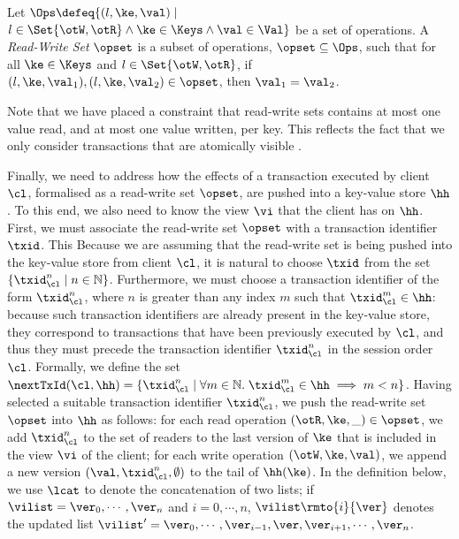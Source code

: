 \begin{definition}
Let 
$\Ops \defeq \{(l, \ke, \val) \mid$ $ l \in \Set{\otW, \otR} \land \ke \in \Keys \wedge \val \in \Val \}$ 
be a set of operations. 
A \emph{Read-Write Set} $\opset$ is a subset of operations, $\opset \subseteq \Ops$,
such that for all $\ke \in \Keys$ and \( l \in \Set{\otW, \otR} \),
if $(l, \ke, \val_1), (l, \ke, \val_2) \in \opset$, then $\val_1 = \val_2$.
\end{definition}
Note that we have placed a constraint that read-write sets contains at most one value read, 
and at most one value written, per key. This reflects the fact that we only consider transactions 
that are atomically visible \cite{laws}.

Finally, we need to address how the effects of a transaction executed by client $\cl$, formalised 
as a read-write set $\opset$, are pushed into a key-value store $\hh$. To this end, we also 
need to know the view $\vi$ that the client has on $\hh$.
First, we must associate the read-write set $\opset$ with a transaction identifier $\txid$. This 
Because we are assuming that the read-write set is being pushed into the key-value store from client $\cl$, 
it is natural to choose $\txid$ from the set $\{\txid_{\cl}^{n} \mid n \in \mathbb{N}\}$. 
Furthermore, we must choose a transaction identifier of the form 
$\txid_{\cl}^{n}$, where $n$ is greater than any index $m$ such that 
$\txid_{\cl}^{m} \in \hh$: because such transaction identifiers are already present 
in the key-value store, they correspond to transactions that have been previously executed 
by $\cl$, and thus they must precede the transaction identifier $\txid_{\cl}^{n}$ in the session 
order $\cl$. Formally, we define the set $\nextTxId(\cl, \hh) = \{ \txid_{\cl}^{n} \mid \forall m \in \mathbb{N}. \; 
\txid_{\cl}^{m} \in \hh \implies m < n\}$. 
Having selected a suitable transaction identifier $\txid_{\cl}^{n}$, we push the read-write set $\opset$ 
into $\hh$ as follows: for each read operation $(\otR, \ke, \_) \in \opset$, we add $\txid_{\cl}^{n}$ 
to the set of readers to the last version of $\ke$ that is included in the view $\vi$ of the client; 
for each write operation $(\otW, \ke, \val)$, we append a new version $(\val, \txid_{\cl}^{n}, \emptyset)$ 
to the tail of $\hh(\ke)$.
In the definition below, we use $\lcat$ to denote the concatenation of two lists; 
if $\vilist = \ver_0, \cdots, \ver_n$ and $i=0,\cdots,n$, 
$\vilist\rmto{i}{\ver}$ denotes the updated list 
$\vilist' = \ver_0, \cdots, \ver_{i-1}, \ver, \ver_{i+1}, \cdots, \ver_{n}$. 
